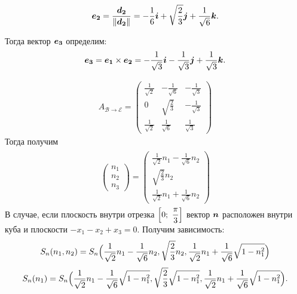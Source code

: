 \documentclass[12pt, a4paper]{article}
\renewcommand{\vec}[1]{\text{\mathversion{bold}${#1}$}}%
\begin{document}
\begin{gather*}
	\vec{e_{2}}=\frac{\vec{d_{2}}}{\|\vec{d_{2}}\|}=-\frac{1}{6}\vec{i}+\sqrt{\frac{2}{3}}\vec{j}+\frac{1}{\sqrt{6}}\vec{k}.
\end{gather*}

Тогда вектор $\vec{e_{3}}$ определим:
\begin{gather*}
	\vec{e_{3}}=\vec{e_{1}} \times \vec{e_{2}}=-\frac{1}{\sqrt{3}}\vec{i}-\frac{1}{\sqrt{3}}\vec{j}+\frac{1}{\sqrt{3}}\vec{k}.
\end{gather*}

\begin{gather*}
	A_{\mathcal{B} \rightarrow \mathcal{E}}=
	\begin{pmatrix}
		\frac{1}{\sqrt{2}} & -\frac{1}{\sqrt{6}} & -\frac{1}{\sqrt{3}}\\
		0 & \sqrt{\frac{2}{3}} & -\frac{1}{\sqrt{3}}\\
		\frac{1}{\sqrt{2}} & \frac{1}{\sqrt{6}} & \frac{1}{\sqrt{3}}
	\end{pmatrix} 
\end{gather*}
Тогда получим
\begin{gather*}
	\begin{align}
		\begin{pmatrix}
			n_{1} \\
			n_{2} \\
			n_{3}
		\end{pmatrix} =
		\begin{pmatrix}
			\frac{1}{\sqrt{2}} n_1 -\frac{1}{\sqrt{6}} n_2 \\
			\sqrt{\frac{2}{3}} n_2\\
			\frac{1}{\sqrt{2}} n_1 + \frac{1}{\sqrt{6}} n_2 
		\end{pmatrix}
	\end{align}
\end{gather*}
В случае, если плоскость внутри отрезка $\Bigl[0;~\dfrac{\pi}{3}\Bigr]$ вектор $\vec{n}$ расположен внутри куба и плоскости $-x_{1}-x_{2}+x_{3}=0.$ Получим зависимость:
\[
S_n(n_1, n_2) = S_n \Bigl( 
\frac{1}{\sqrt{2}} n_1 -\frac{1}{\sqrt{6}} n_2, 
\sqrt{\frac{2}{3}} n_2,
\frac{1}{\sqrt{2}} n_1 + \frac{1}{\sqrt{6}} \sqrt{1-n_1^2}
\Bigr)
\]
\[ S_n(n_1) = S_n \Bigl( 
\frac{1}{\sqrt{2}} n_1 -\frac{1}{\sqrt{6}} \sqrt{1-n_1^2}, 
\sqrt{\frac{2}{3}} \sqrt{1-n_1^2},
\frac{1}{\sqrt{2}} n_1 + \frac{1}{\sqrt{6}} \sqrt{1-n_1^2}
\Bigr).
\] 
\end{document}
